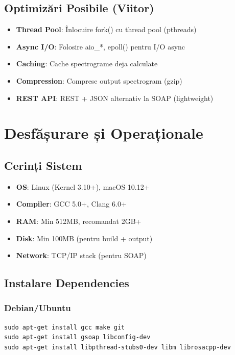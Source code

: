 \documentclass[12pt,a4paper,twoside]{article}
\begin{document}
\begin{itemize}
\subsection{Optimizări Posibile (Viitor)}

\begin{itemize}
    \item \textbf{Thread Pool}: Înlocuire fork() cu thread pool (pthreads)
    \item \textbf{Async I/O}: Folosire aio\_*, epoll() pentru I/O async
    \item \textbf{Caching}: Cache spectrograme deja calculate
    \item \textbf{Compression}: Comprese output spectrogram (gzip)
    \item \textbf{REST API}: REST + JSON alternativ la SOAP (lightweight)
\end{itemize}

\section{Desfășurare și Operaționale}

\subsection{Cerinți Sistem}

\begin{itemize}
    \item \textbf{OS}: Linux (Kernel 3.10+), macOS 10.12+
    \item \textbf{Compiler}: GCC 5.0+, Clang 6.0+
    \item \textbf{RAM}: Min 512MB, recomandat 2GB+
    \item \textbf{Disk}: Min 100MB (pentru build + output)
    \item \textbf{Network}: TCP/IP stack (pentru SOAP)
\end{itemize}

\subsection{Instalare Dependencies}

\subsubsection{Debian/Ubuntu}
\begin{lstlisting}
sudo apt-get install gcc make git
sudo apt-get install gsoap libconfig-dev
sudo apt-get install libpthread-stubs0-dev libm librosacpp-dev
\end{lstlisting}


\end{itemize}
\end{document}
